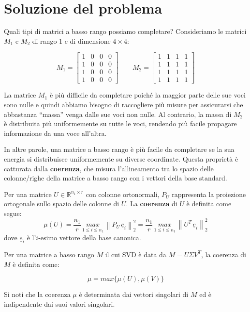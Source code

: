 \documentclass[12pt,a4paper]{report}
\newcommand{\normtwo}[1]{\left\lVert#1\right\rVert _2^2}
\begin{document}
\section{Soluzione del problema}

Quali tipi di matrici a basso rango possiamo completare?
Consideriamo le matrici $M_1$ e $M_2$ di rango $1$ e di dimensione $4 \times 4$:

$$M_1 = \begin{bmatrix}
  1 & 0 & 0 & 0 \\ 1 & 0 & 0 & 0 \\ 1 & 0 & 0 & 0 \\ 1 & 0 & 0 & 0
\end{bmatrix}
\qquad
M_2 = \begin{bmatrix}
  1 & 1 & 1 & 1 \\ 1 & 1 & 1 & 1 \\ 1 & 1 & 1 & 1 \\ 1 & 1 & 1 & 1
\end{bmatrix}$$

La matrice $M_1$ è più difficile da completare
poiché la maggior parte delle sue voci sono nulle
e quindi abbiamo bisogno di raccogliere più misure per assicurarsi
che abbastanza ``massa'' venga dalle sue voci non nulle.
Al contrario, la massa di $M_2$ è distribuita più uniformemente su tutte le voci,
rendendo più facile propagare informazione da una voce all'altra.

In altre parole, una matrice a basso rango è più facile da completare se la sua energia
si distribuisce uniformemente su diverse coordinate.
Questa proprietà è catturata dalla \textbf{coerenza}, che misura l'allineamento
tra lo spazio delle colonne/righe della matrice a basso rango con i vettori della base standard.

Per una matrice $U\in\mathbb{R}^{n_1\times r}$ con colonne ortonormali,
$P_U$ rappresenta la proiezione ortogonale sullo spazio delle colonne di $U$.
La \textbf{coerenza} di $U$ è definita come segue:
$$ \mu(U) = \frac{n_1}{r}\, \underset{1 \leq i \leq n_1}{max}\, \normtwo{P_U\, \underline{e}_i}
= \frac{n_1}{r}\, \underset{1 \leq i \leq n_1}{max}\, \normtwo{U^T\, \underline{e}_i}$$
dove $\underline{e}_i$ è l'$i$-esimo vettore della base canonica.

Per una matrice a basso rango $M$ il cui SVD è data da $M=U\Sigma V^T$,
la coerenza di $M$ è definita come:

$$ \mu = max\{\mu(U), \mu(V)\} $$

Si noti che la coerenza $\mu$ è determinata dai vettori singolari di $M$ ed
è indipendente dai suoi valori singolari.
\end{document}
